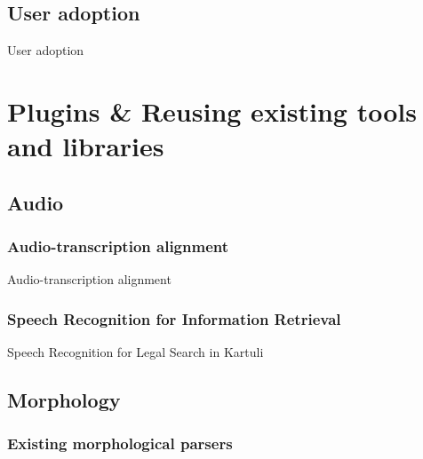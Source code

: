 \documentclass{beamer}
\begin{document}
\subsection{User adoption}

\begin{frame}
User adoption
\end{frame}


%


\section[Plugins]{Plugins \& Reusing existing tools and libraries}

\subsection{Audio}
\subsubsection[Alignment]{Audio-transcription alignment}

\begin{frame}
Audio-transcription alignment
\end{frame}


\subsubsection[ASR]{Speech Recognition for Information Retrieval}

\begin{frame}
Speech Recognition for Legal Search in Kartuli
\end{frame}


\subsection{Morphology}



\subsubsection[Existing]{Existing morphological parsers}
\end{document}
